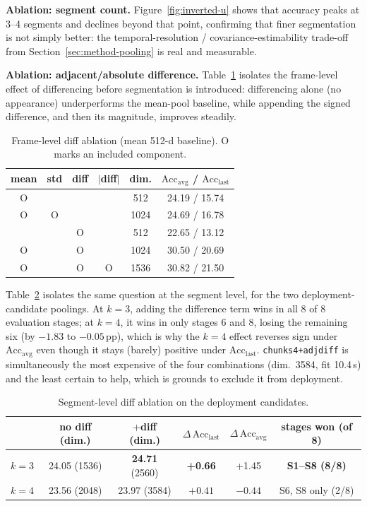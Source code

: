 \documentclass[a4paper,fleqn]{cas-dc}
\begin{document}
\textbf{Ablation: segment count.} Figure~\ref{fig:inverted-u} shows that
accuracy peaks at 3--4 segments and declines beyond that point, confirming
that finer segmentation is not simply better: the temporal-resolution /
covariance-estimability trade-off from Section~\ref{sec:method-pooling}
is real and measurable.

\textbf{Ablation: adjacent/absolute difference.} Table~\ref{tab:diff-frame}
isolates the frame-level effect of differencing before segmentation is
introduced: differencing alone (no appearance) underperforms the mean-pool
baseline, while appending the signed difference, and then its magnitude,
improves steadily.

\begin{table}[pos=!htb]
\centering
\caption{Frame-level diff ablation (mean 512-d baseline). O marks an
included component.}
\label{tab:diff-frame}
\small
\begin{tabular}{@{}cccccc@{}}
\toprule
mean & std & diff & $|$diff$|$ & dim. & $\mathrm{Acc}_{\mathrm{avg}}$ / $\mathrm{Acc}_{\mathrm{last}}$ \\
\midrule
O & & & & 512 & 24.19 / 15.74 \\
O & O & & & 1024 & 24.69 / 16.78 \\
 & & O & & 512 & 22.65 / 13.12 \\
O & & O & & 1024 & 30.50 / 20.69 \\
O & & O & O & 1536 & 30.82 / 21.50 \\
\bottomrule
\end{tabular}
\end{table}

Table~\ref{tab:diff-segment} isolates the same question at the segment
level, for the two deployment-candidate poolings. At $k{=}3$, adding the
difference term wins in all 8 of 8 evaluation stages; at $k{=}4$, it wins
in only stages 6 and 8, losing the remaining six (by
$-1.83$ to $-0.05$\,pp), which is why the $k{=}4$ effect reverses sign
under $\mathrm{Acc}_{\mathrm{avg}}$ even though it stays (barely) positive
under $\mathrm{Acc}_{\mathrm{last}}$. \texttt{chunks4+adjdiff} is
simultaneously the most expensive of the four combinations (dim.\ 3584, fit
10.4\,s) and the least certain to help, which is grounds to exclude it from
deployment.

\begin{table}[pos=!t]
\centering
\caption{Segment-level diff ablation on the deployment candidates.}
\label{tab:diff-segment}
\small
\begin{tabular}{@{}lccccc@{}}
\toprule
& no diff (dim.) & $+$diff (dim.) & $\Delta\,\mathrm{Acc}_{\mathrm{last}}$ & $\Delta\,\mathrm{Acc}_{\mathrm{avg}}$ & stages won (of 8) \\
\midrule
$k{=}3$ & 24.05 (1536) & \textbf{24.71} (2560) & \textbf{+0.66} & +1.45 & \textbf{S1--S8 (8/8)} \\
$k{=}4$ & 23.56 (2048) & 23.97 (3584) & $+0.41$ & \textbf{$-0.44$} & S6, S8 only (2/8) \\
\bottomrule
\end{tabular}
\end{table}
\end{document}
